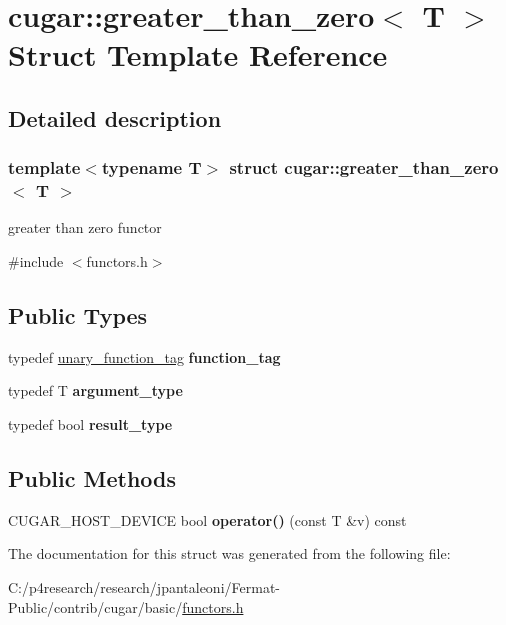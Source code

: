 \hypertarget{structcugar_1_1greater__than__zero}{}\section{cugar\+:\+:greater\+\_\+than\+\_\+zero$<$ T $>$ Struct Template Reference}
\label{structcugar_1_1greater__than__zero}


\subsection{Detailed description}
\subsubsection*{template$<$typename T$>$\newline
struct cugar\+::greater\+\_\+than\+\_\+zero$<$ T $>$}

greater than zero functor 

{\ttfamily \#include $<$functors.\+h$>$}

\subsection*{Public Types}
\begin{DoxyCompactItemize}
\item 
\mbox{\label{structcugar_1_1greater__than__zero_ae0964ca9759f02185f1c1efea8569fd8}} 
typedef \hyperlink{structcugar_1_1unary__function__tag}{unary\+\_\+function\+\_\+tag} {\bfseries function\+\_\+tag}
\item 
\mbox{\label{structcugar_1_1greater__than__zero_a8b6ce614a57662c5c2c2185c5aeeb1f0}} 
typedef T {\bfseries argument\+\_\+type}
\item 
\mbox{\label{structcugar_1_1greater__than__zero_a34ef9453c0344ebba0a0d2b2c1617238}} 
typedef bool {\bfseries result\+\_\+type}
\end{DoxyCompactItemize}
\subsection*{Public Methods}
\begin{DoxyCompactItemize}
\item 
\mbox{\label{structcugar_1_1greater__than__zero_af09beb6aaccd355577621748ea1a6761}} 
C\+U\+G\+A\+R\+\_\+\+H\+O\+S\+T\+\_\+\+D\+E\+V\+I\+CE bool {\bfseries operator()} (const T \&v) const
\end{DoxyCompactItemize}


The documentation for this struct was generated from the following file\+:\begin{DoxyCompactItemize}
\item 
C\+:/p4research/research/jpantaleoni/\+Fermat-\/\+Public/contrib/cugar/basic/\hyperlink{functors_8h}{functors.\+h}\end{DoxyCompactItemize}
